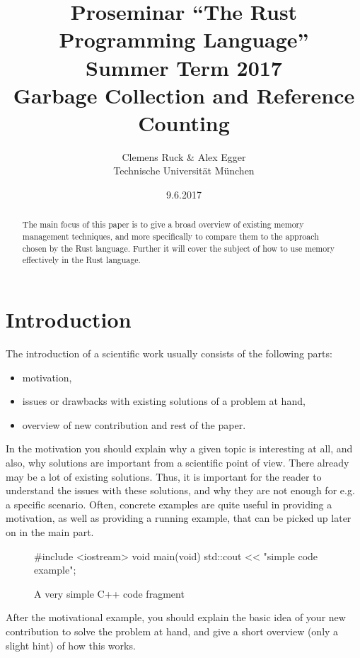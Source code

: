 \documentclass[twocolumn]{article}
\author{Clemens Ruck \& Alex Egger\\ Technische Universit\"at M\"unchen}
\title{Proseminar ``The Rust Programming Language'' \\
       Summer Term 2017 \\
       {\bf Garbage Collection and Reference Counting}
}
\date{9.6.2017}
\begin{document}
\maketitle

\begin{abstract}
The main focus of this paper is to give a broad overview
of existing memory management techniques, and more specifically
to compare them to the approach chosen by the Rust language.
Further it will cover the subject of how to use memory effectively in the Rust language.
\end{abstract}

\section{Introduction}

\label{introduction}


The introduction of a scientific work usually consists of the following
parts:
\begin{itemize}
	\item motivation,
	\item issues or drawbacks with existing solutions of a problem at hand,
	\item overview of new contribution and rest of the paper.
\end{itemize}
In the motivation you should explain why a given topic is interesting
at all, and also, why solutions are important from a scientific point
of view. There already may be a lot of existing solutions. Thus, it
is important for the reader to understand the issues with these solutions,
and why they are not enough for e.g. a specific scenario. Often, concrete
examples are quite useful in providing a motivation, as well as providing
a running example, that can be picked up later on in the main part.
\begin{figure}
\begin{cppcode}
#include <iostream>
void main(void){
  std::cout << "simple code example";
}
\end{cppcode}

\vspace{-2em}
\caption{A very simple C++ code fragment}
\label{introexample}
\end{figure}
After the motivational example, you should explain the basic idea of your new
contribution to solve the problem at hand, and give a short overview
(only a slight hint) of how this works.
\end{document}
